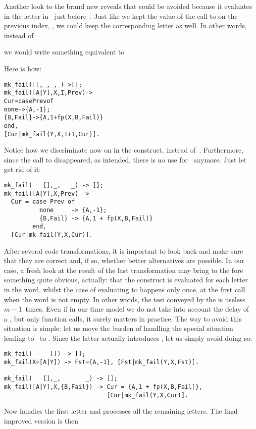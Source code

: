 Another look to the brand new  reveals that
 could be avoided because it evaluates in the
letter in~ just before~. Just like we kept the
value of the call to  on the previous index,
, we could keep the corresponding letter as well. In
other words, instead of
\begin{center}
\end{center}
we would write something equivalent to
\begin{center}
\end{center}
Here is how:
\begin{alltt}
mk_fail(   [],_,_,   _) -> [];
mk_fail([A|Y],X,I,Prev) ->
  Cur = case Prev of
          none     -> \{A,-1\};
          \{B,Fail\} -> \{A,1 + fp(X,B,Fail)\}
        end,
  [Cur|mk_fail(Y,X,I+1,Cur)].
\end{alltt}
Notice how we discriminate now on  in the 
construct, instead of~. Furthermore, since the call to
 disappeared, as intended, there is no use
for~ anymore. Just let get rid of it:
\begin{verbatim}
mk_fail(   [],_,   _) -> [];
mk_fail([A|Y],X,Prev) ->
  Cur = case Prev of
          none     -> {A,-1};
          {B,Fail} -> {A,1 + fp(X,B,Fail)}
        end,
  [Cur|mk_fail(Y,X,Cur)].
\end{verbatim}
After several code transformations, it is important to look back and
make sure that they are correct and, if so, whether better
alternatives are possible. In our case, a fresh look at the result of
the last transformation may bring to the fore something quite obvious,
actually: that the  construct is evaluated for each
letter in the word, whilst the case of  evaluating to
 happens only once, at the first call when the word is
not empty. In other words, the test conveyed by the  is
useless \(m-1\)~times. Even if in our time model we do not take into
account the delay of a , but only function calls, it
surely matters in practice. The way to avoid this situation is simple:
let us move the burden of handling the special situation leading
to~ to . Since the latter actually
introduces , let us simply avoid doing so:
\begin{verbatim}
mk_fail(     []) -> [];
mk_fail(X=[A|Y]) -> Fst={A,-1}, [Fst|mk_fail(Y,X,Fst)].

mk_fail(   [],_,       _) -> [];
mk_fail([A|Y],X,{B,Fail}) -> Cur = {A,1 + fp(X,B,Fail)},
                             [Cur|mk_fail(Y,X,Cur)].
\end{verbatim}
Now  handles the first letter and
 processes all the remaining letters. The final
improved version is then 

